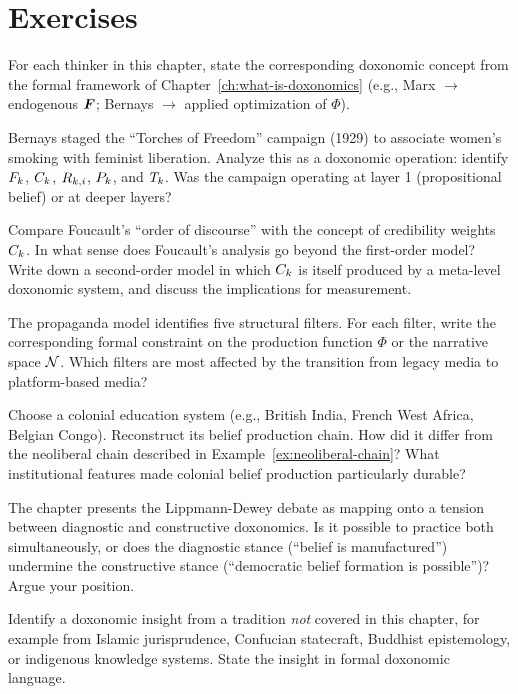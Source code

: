 \section{Exercises}

\begin{exercise}
For each thinker in this chapter, state the corresponding doxonomic concept from the formal framework of Chapter~\ref{ch:what-is-doxonomics} (e.g., Marx $\to$ endogenous $\bm{F}$; Bernays $\to$ applied optimization of $\Phi$).
\end{exercise}

\begin{exercise}
Bernays staged the ``Torches of Freedom'' campaign (1929) to associate women's smoking with feminist liberation.
Analyze this as a doxonomic operation: identify $F_{k}$, $C_{k}$, $R_{k,i}$, $P_{k}$, and $T_{k}$.
Was the campaign operating at layer 1 (propositional belief) or at deeper layers?
\end{exercise}

\begin{exercise}
Compare Foucault's ``order of discourse'' with the concept of credibility weights $C_{k}$.
In what sense does Foucault's analysis go beyond the first-order model?
Write down a second-order model in which $C_{k}$ is itself produced by a meta-level doxonomic system, and discuss the implications for measurement.
\end{exercise}

\begin{exercise}
The propaganda model identifies five structural filters.
For each filter, write the corresponding formal constraint on the production function $\Phi$ or the narrative space $\mathcal{N}$.
Which filters are most affected by the transition from legacy media to platform-based media?
\end{exercise}

\begin{exercise}
Choose a colonial education system (e.g., British India, French West Africa, Belgian Congo).
Reconstruct its belief production chain.
How did it differ from the neoliberal chain described in Example~\ref{ex:neoliberal-chain}?
What institutional features made colonial belief production particularly durable?
\end{exercise}

\begin{exercise}
The chapter presents the Lippmann-Dewey debate as mapping onto a tension between diagnostic and constructive doxonomics.
Is it possible to practice both simultaneously, or does the diagnostic stance (``belief is manufactured'') undermine the constructive stance (``democratic belief formation is possible'')?
Argue your position.
\end{exercise}

\begin{exercise}
Identify a doxonomic insight from a tradition \emph{not} covered in this chapter, for example from Islamic jurisprudence, Confucian statecraft, Buddhist epistemology, or indigenous knowledge systems.
State the insight in formal doxonomic language.
\end{exercise}
